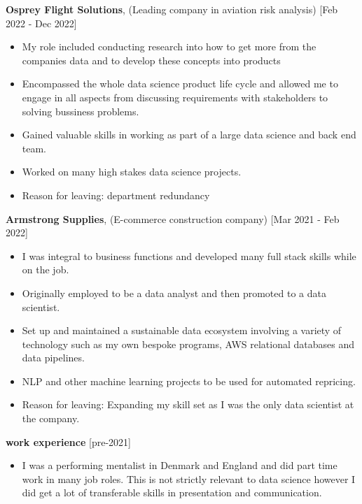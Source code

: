 \documentclass[10pt]{article}
\begin{document}
{\begin{itemize}
\end{itemize}

{\bf Osprey Flight Solutions}, (Leading company in aviation risk analysis) [Feb 2022 - Dec 2022]
\begin{itemize}
\setlength{\itemsep}{0.10ex}
\item My role included conducting research into how to get more from the companies
data and to develop these concepts into products
\item Encompassed the whole data science product
life cycle and allowed me to engage in all aspects from discussing requirements with stakeholders to
solving bussiness problems.
\item Gained valuable skills in working as part of a large data science and back end team.
\item Worked on many high stakes data science projects.
\item Reason for leaving: department redundancy
\end{itemize}

{\bf Armstrong Supplies}, (E-commerce construction company) 	[Mar 2021 - Feb 2022]
\begin{itemize}
\setlength{\itemsep}{0.10ex}
\item I was integral to business functions and developed many full stack skills while on the job.
\item Originally employed to be a data analyst and then promoted to a data scientist.
\item Set up and maintained a sustainable data ecosystem involving a variety of
technology such as my own bespoke programs, AWS relational databases and data pipelines.
\item NLP and other machine learning projects to be used for automated repricing.
\item Reason for leaving: Expanding my skill set as I was the only data scientist at the company.
\end{itemize}

{\bf work experience} [pre-2021]
\begin{itemize}
\setlength{\itemsep}{0.10ex}
\item I was a performing mentalist in Denmark and England and did part time work in many job roles. This is not strictly relevant to data science however I did get a lot of transferable skills in presentation and communication.
\end{itemize}






}
\end{document}
